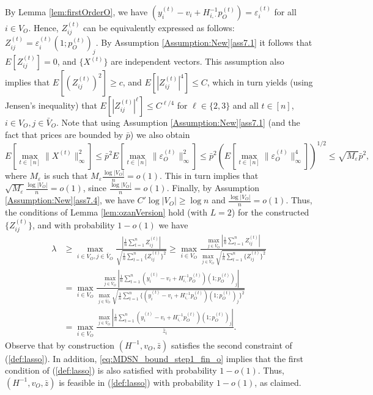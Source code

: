 \documentclass[opre,nonblindrev]{informs3} %
\begin{document}
\begin{APPENDIX}{}
By Lemma \ref{lem:firstOrderO},
we have
$(y_i^{(t)} -  v_i+ H^{-1}_{i,\cdot}p_O^{(t)}) = \varepsilon_i^{(t)}$ for all $i\in V_O$. Hence,
$Z^{(t)}_{ij}$
can be equivalently expressed as follows:
$Z^{(t)}_{ij} ={\varepsilon_i^{(t)}(1;p_O^{(t)})_j}$.
By Assumption \ref{Assumption:New}\ref{ass7.1} it follows that  $E[Z^{(t)}_{ij}]=0$, and
 $\{X^{(t)}\}$ are independent vectors.
This assumption also implies that
  $E[ (Z^{(t)}_{ij})^2]\geq c$, and
  $E[ |Z^{(t)}_{ij}|^4]\leq C$, which in turn yields (using Jensen's inequality) 
  that 
  $E[ |Z^{(t)}_{ij}|^\ell]\leq C^{\ell/4}$
 for 
 $\ell\in \{2,3\}$ and
 all $t\in[n]$, $i\in V_O,j\in \bar{V}_O$.
 Note that using
Assumption  \ref{Assumption:New}\ref{ass7.1} 
(and the fact that prices are bounded by $\bar p$)
we also obtain
\[
E[\max_{t\in[n] } \|X^{(t)}\|_\infty^2 ] \leq 
\bar p^2 E[\max_{t\in[n] } \|\varepsilon_O^{(t)}\|_\infty^2 ]
\leq
\bar p^2 (E[\max_{t\in[n] } \|\varepsilon_O^{(t)}\|_\infty^4 ])^{1/2}
\leq \sqrt{ {M}_\varepsilon } \bar p^2,
\]
 where
 ${M}_\varepsilon$
 is such that
 $ {M}_\varepsilon \frac{\log |V_O|}{n} = o(1)$. This in turn implies that
 $\sqrt{{M}_\varepsilon} \frac{\log |V_O|}{n} = o(1)$, since $\frac{\log |V_O|}{n}=o(1)$.
 Finally,
 by Assumption \ref{Assumption:New}\ref{ass7.4}, we have
 $ C' \log |V_O| \geq  \log n$ and $\frac{\log |V_O|}{n}=o(1)$.
 Thus, the
 conditions of   Lemma \ref{lem:ozanVersion}
 hold
 (with $L=2$)
  for the constructed $\{Z^{(t)}_{ij} \}$, and
 with probability $1-o(1)$ we have
 \begin{equation} \label{eq:MDSN_bound_step1_fin_o}
 \begin{aligned}
 \lambda  &\geq
 \max_{i\in V_O,j\in \bar{V}_O}
 \frac{    \left|\frac{1}{n} \sum_{t=1}^n  Z^{(t)}_{ij}  \right| }{   \sqrt{\frac{1}{n}
 		\sum_{t=1}^n \{Z^{(t)}_{ij} \}^2}}
 \geq 
 \max_{i\in {V}_O}
 \frac{  \max_{j\in \bar{V}_O} \left|\frac{1}{n} \sum_{t=1}^n  Z^{(t)}_{ij}  \right| }{  \max_{j\in \bar{V}_O} \sqrt{\frac{1}{n}
 		\sum_{t=1}^n \{Z^{(t)}_{ij} \}^2}}\\
& =
 \max_{i\in {V}_O} \frac{ \max_{j\in\bar{V}_O} \left| \frac{1}{n}
 	\sum_{t=1}^n
 	(y_i^{(t)} -  v_i + H^{-1}_{i,\cdot}p_O^{(t)})(1;p_O^{(t)})_j
 	\right|}{  \max_{j\in\bar{V}_O} \sqrt{\frac{1}{n} \sum_{t=1}^n
 		\{{ (y_i^{(t)} -  v_i + H^{-1}_{i,\cdot}p_O^{(t)})(1;p_O^{(t)})_j} \}^2
 	}} \\
 &=
 \max_{i\in{ V}_O}
\frac{ \max_{j\in\bar{V}_O} \left| \frac{1}{n}
	\sum_{t=1}^n
	(y_i^{(t)} -  v_i + H^{-1}_{i,\cdot}p_O^{(t)})(1;p_O^{(t)})_j
	\right|}
{\bar{z}_i }.
 \end{aligned}
 \end{equation}
Observe that by construction
$(H^{-1}, v_O, \bar{z})$ satisfies the second constraint of
(\ref{def:lasso}).  In addition, \eqref{eq:MDSN_bound_step1_fin_o} implies that the first condition of
(\ref{def:lasso}) is also satisfied with probability $1-o(1)$.
Thus, $(H^{-1}, v_O, \bar{z})$ is feasible in (\ref{def:lasso}) with probability
$1-o(1)$, as claimed.



\end{APPENDIX}
\end{document}
